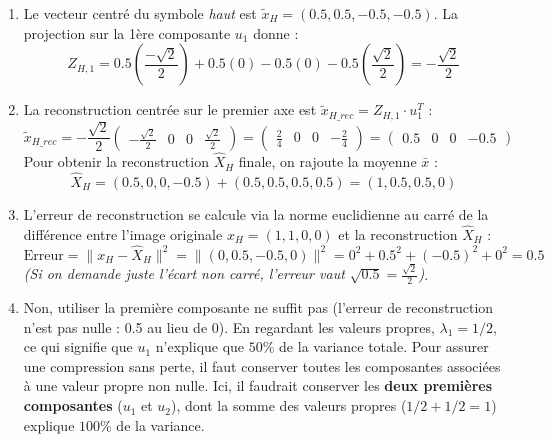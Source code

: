 \documentclass[solutions]{../exercices}
\begin{document}
\begin{solution}
\begin{enumerate}
		\item Le vecteur centré du symbole \textit{haut} est $\tilde{x}_H = (0.5, 0.5, -0.5, -0.5)$. 
		La projection sur la 1ère composante $u_1$ donne :
		\[ Z_{H,1} = 0.5\left(\frac{-\sqrt{2}}{2}\right) + 0.5(0) - 0.5(0) - 0.5\left(\frac{\sqrt{2}}{2}\right) = -\frac{\sqrt{2}}{2} \]

		\item La reconstruction centrée sur le premier axe est $\tilde{x}_{H\_rec} = Z_{H,1} \cdot u_1^T$ :
		\[ \tilde{x}_{H\_rec} = -\frac{\sqrt{2}}{2} \begin{pmatrix} -\frac{\sqrt{2}}{2} & 0 & 0 & \frac{\sqrt{2}}{2} \end{pmatrix} = \begin{pmatrix} \frac{2}{4} & 0 & 0 & -\frac{2}{4} \end{pmatrix} = \begin{pmatrix} 0.5 & 0 & 0 & -0.5 \end{pmatrix} \]
		Pour obtenir la reconstruction $\hat{X}_H$ finale, on rajoute la moyenne $\bar{x}$ :
		\[ \hat{X}_H = (0.5, 0, 0, -0.5) + (0.5, 0.5, 0.5, 0.5) = (1, 0.5, 0.5, 0) \]

		\item L'erreur de reconstruction se calcule via la norme euclidienne au carré de la différence entre l'image originale $x_H = (1, 1, 0, 0)$ et la reconstruction $\hat{X}_H$ :
		\[ \text{Erreur} = \| x_H - \hat{X}_H \|^2 = \| (0, 0.5, -0.5, 0) \|^2 = 0^2 + 0.5^2 + (-0.5)^2 + 0^2 = 0.5 \]
		\textit{(Si on demande juste l'écart non carré, l'erreur vaut $\sqrt{0.5} = \frac{\sqrt{2}}{2}$)}.

		\item Non, utiliser la première composante ne suffit pas (l'erreur de reconstruction n'est pas nulle : 0.5 au lieu de 0). En regardant les valeurs propres, $\lambda_1 = 1/2$, ce qui signifie que $u_1$ n'explique que $50\%$ de la variance totale.
		Pour assurer une compression sans perte, il faut conserver toutes les composantes associées à une valeur propre non nulle. Ici, il faudrait conserver les \textbf{deux premières composantes} ($u_1$ et $u_2$), dont la somme des valeurs propres ($1/2 + 1/2 = 1$) explique $100\%$ de la variance.
	\end{enumerate}
\end{solution}
\end{document}
